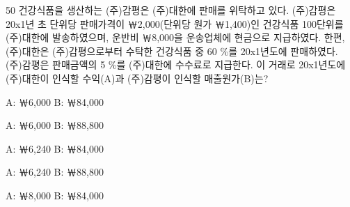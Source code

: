 \begin{question}{50}
건강식품을 생산하는 (주)감평은 (주)대한에 판매를 위탁하고 있다. (주)감평은 20x1년 초 단위당 판매가격이 ￦2,000(단위당 원가 ￦1,400)인 건강식품 100단위를 (주)대한에 발송하였으며, 운반비 ￦8,000을 운송업체에 현금으로 지급하였다. 한편, (주)대한은 (주)감평으로부터 수탁한 건강식품 중 60 \%를 20x1년도에 판매하였다. (주)감평은 판매금액의 5 \%를 (주)대한에 수수료로 지급한다. 이 거래로 20x1년도에 (주)대한이 인식할 수익(A)과 (주)감평이 인식할 매출원가(B)는?
\begin{choices}
  \item A: ￦6,000		B: ￦84,000
  \item A: ￦6,000		B: ￦88,800
  \item A: ￦6,240		B: ￦84,000
  \item A: ￦6,240		B: ￦88,800
  \item A: ￦8,000		B: ￦84,000
\end{choices}
\end{question}
